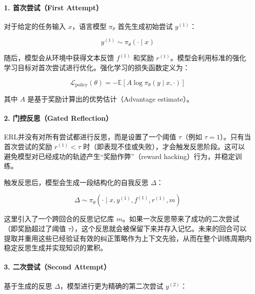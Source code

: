 \hypertarget{ux9996ux6b21ux5c1dux8bd5first-attempt}{%
\paragraph{1. 首次尝试（First Attempt）}\label{ux9996ux6b21ux5c1dux8bd5first-attempt}}

对于给定的任务输入 \(x\)，语言模型 \(\pi_\theta\) 首先生成初始尝试 \(y^{(1)}\)：

\[
y^{(1)}\sim\pi_\theta(\cdot\mid x)
\]

随后，模型会从环境中获得文本反馈 \(f^{(1)}\) 和奖励 \(r^{(1)}\)。模型会利用标准的强化学习目标对首次尝试进行优化。强化学习的损失函数定义为：

\[
\mathcal{L}_{\mathrm{policy}}(\theta)=-\mathbb{E}\left[A\log\pi_\theta(y\mid x,\cdot)\right]
\]

其中 \(A\) 是基于奖励计算出的优势估计（Advantage estimate）。

\hypertarget{ux95e8ux63a7ux53cdux601dgated-reflection}{%
\paragraph{2. 门控反思（Gated Reflection）}\label{ux95e8ux63a7ux53cdux601dgated-reflection}}

ERL并没有对所有尝试都进行反思，而是设置了一个阈值 \(\tau\)（例如 \(\tau=1\)）。只有当首次尝试的奖励 \(r^{(1)}\lt\tau\) 时（即表现不佳或失败），才会触发反思阶段。这可以避免模型对已经成功的轨迹产生``奖励作弊''（reward hacking）行为，并稳定训练。

触发反思后，模型会生成一段结构化的自我反思 \(\Delta\)：

\[
\Delta\sim\pi_\theta(\cdot\mid x,y^{(1)},f^{(1)},r^{(1)},m)
\]

这里引入了一个跨回合的反思记忆库 \(m\)。如果一次反思带来了成功的二次尝试（即奖励超过了阈值 \(\tau\)），这个反思就会被保留下来并存入记忆。未来的回合可以提取并重用这些已经验证有效的纠正策略作为上下文先验，从而在整个训练周期内稳定反思生成并实现知识的累积。

\hypertarget{ux4e8cux6b21ux5c1dux8bd5second-attempt}{%
\paragraph{3. 二次尝试（Second Attempt）}\label{ux4e8cux6b21ux5c1dux8bd5second-attempt}}

基于生成的反思 \(\Delta\)，模型进行更为精确的第二次尝试 \(y^{(2)}\)：

